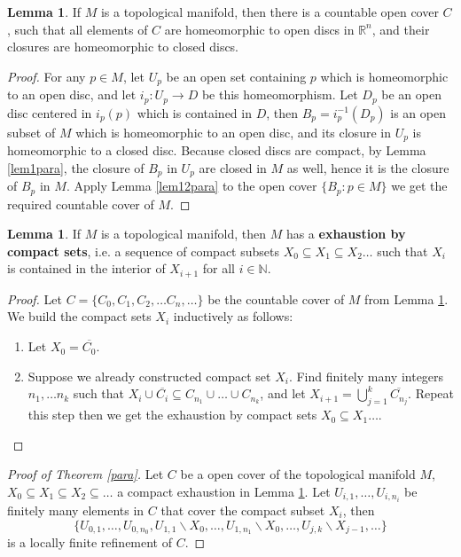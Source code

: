 \documentclass{article}
\theoremstyle{definition}
\newtheorem{lem}[thm]{Lemma}
\begin{document}
\begin{lem}\label{lem2para}
    If $M$ is a topological manifold, then there is a countable open cover $C$, such that all elements of $C$ are homeomorphic to open discs in $\mathbb{R}^n$, and their closures are homeomorphic to closed discs. 
\end{lem}

\begin{proof}
    For any $p\in M$, let $U_p$ be an open set containing $p$ which is homeomorphic to an open disc, and let $i_p: U_p\rightarrow D$ be this homeomorphism. Let $D_p$ be an open disc centered in $i_p(p)$ which is contained in $D$, then $B_p=i_p^{-1}(D_p)$ is an open subset of $M$ which is homeomorphic to an open disc, and its closure in $U_p$ is homeomorphic to a closed disc. Because closed discs are compact, by Lemma \ref{lem1para}, the closure of $B_p$ in $U_p$ are closed in $M$ as well, hence it is the closure of $B_p$ in $M$. Apply Lemma \ref{lem12para} to the open cover $\{B_p: p\in M\}$ we get the required countable cover of $M$.
\end{proof}

\begin{lem}\label{lem3para}
    If $M$ is a topological manifold, then $M$ has a {\bf exhaustion by compact sets}, i.e. a sequence of compact subsets $X_0\subseteq X_1\subseteq X_2\dots$ such that $X_i$ is contained in the interior of $X_{i+1}$ for all $i\in\mathbb{N}$. 
\end{lem}

\begin{proof}
    Let $C=\{C_0, C_1, C_2, \dots C_n, \dots\}$ be the countable cover of $M$ from Lemma \ref{lem2para}. We build the compact sets $X_i$ inductively as follows:
    \begin{enumerate}
        \item Let $X_0=\overline{C_0}$.
        \item Suppose we already constructed compact set $X_i$. Find finitely many integers $n_1, \dots n_k$ such that $X_i\cup \overline{C_i}\subseteq C_{n_1}\cup\dots \cup C_{n_k}$, and let $X_{i+1}=\bigcup_{j=1}^k \overline{C_{n_j}}$. Repeat this step then we get the exhaustion by compact sets $X_0\subseteq X_1\dots$.
    \end{enumerate}
\end{proof}

\begin{proof}[Proof of Theorem \ref{para}] 
     Let $C$ be a open cover of the topological manifold $M$, $X_0\subseteq X_1\subseteq X_2\subseteq \dots$ a compact exhaustion in Lemma \ref{lem3para}. Let $U_{i, 1}, \dots, U_{i, n_i}$ be finitely many elements in $C$ that cover the compact subset $X_i$, then 
     \[\{U_{0, 1}, \dots, U_{0, n_0}, U_{1, 1}\backslash X_0, \dots, U_{1, n_1}\backslash X_0, \dots, U_{j, k}\backslash X_{j-1}, \dots\}\]
     is a locally finite refinement of $C$.
\end{proof}
\end{document}
